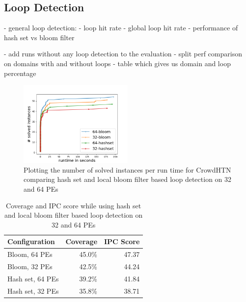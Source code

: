 \subsection{Loop Detection}
\label{eval: loop detection}
- general loop detection:
- loop hit rate
- global loop hit rate
- performance of hash set vs bloom filter

- add runs without any loop detection to the evaluation
- split perf comparison on domains with and without loops
- table which gives us domain and loop percentage

\begin{figure}
	\caption{Plotting the number of solved instances per run time for CrowdHTN comparing hash set and local bloom filter based loop detection on 32 and 64 PEs}
	\label{figure: eval loop detection}
	\centering
	\includegraphics[width=0.5\textwidth]{images/final/loop_detection}
\end{figure}

\begin{table}
	\caption{Coverage and IPC score while using hash set and local bloom filter based loop detection on 32 and 64 PEs}
	\label{table: eval loop detection}
	\centering
	\begin{tabular}{| l | r | r |}
		\hline
		Configuration & Coverage & IPC Score \\
		\hline
		Bloom, 64 PEs		& 45.0\%	& 47.37 \\ %
		Bloom, 32 PEs		& 42.5\%	& 44.24 \\ %
		Hash set, 64 PEs	& 39.2\%	& 41.84 \\ %
		Hash set, 32 PEs	& 35.8\%	& 38.71 \\ %
		\hline
	\end{tabular}
\end{table}

